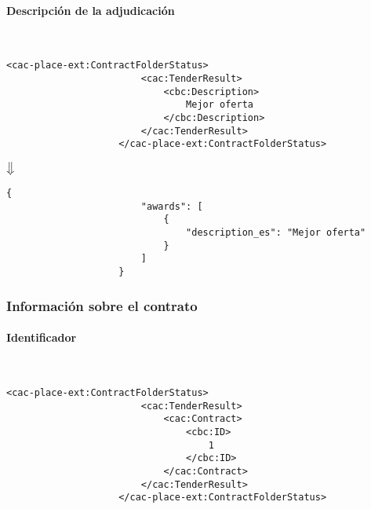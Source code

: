             \paragraph{Descripción de la adjudicación} \mbox{}\\
                \begin{lstlisting}[language=lXML]
                    <cac-place-ext:ContractFolderStatus>
                        <cac:TenderResult>
                            <cbc:Description>
                                Mejor oferta
                            </cbc:Description>
                        </cac:TenderResult>
                    </cac-place-ext:ContractFolderStatus>
                \end{lstlisting}
                
                \begin{center}
                    $\big\Downarrow$
                \end{center}
                
                \begin{lstlisting}[language=lJSON]
                    {
                        "awards": [
                            {
                                "description_es": "Mejor oferta"
                            }
                        ]
                    }
                \end{lstlisting}
                
        \subsubsection{Información sobre el contrato}
            \paragraph{Identificador} \mbox{}\\
                \begin{lstlisting}[language=lXML]
                    <cac-place-ext:ContractFolderStatus>
                        <cac:TenderResult>
                            <cac:Contract>
                                <cbc:ID>
                                    1
                                </cbc:ID>
                            </cac:Contract>
                        </cac:TenderResult>
                    </cac-place-ext:ContractFolderStatus>
                \end{lstlisting}
                

